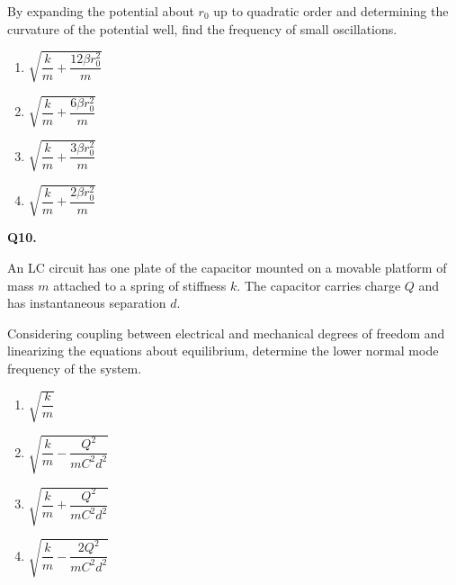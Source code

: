 \documentclass[12pt]{article}
\begin{document}
By expanding the potential about $r_0$ up to quadratic order and determining the curvature of the potential well, find the frequency of small oscillations.

\begin{enumerate}
\item[(A)] $\sqrt{\dfrac{k}{m}+\dfrac{12\beta r_0^2}{m}}$
\item[(B)] $\sqrt{\dfrac{k}{m}+\dfrac{6\beta r_0^2}{m}}$
\item[(C)] $\sqrt{\dfrac{k}{m}+\dfrac{3\beta r_0^2}{m}}$
\item[(D)] $\sqrt{\dfrac{k}{m}+\dfrac{2\beta r_0^2}{m}}$
\end{enumerate}

\bigskip

\textbf{Q10.}

An LC circuit has one plate of the capacitor mounted on a movable platform of mass $m$ attached to a spring of stiffness $k$. The capacitor carries charge $Q$ and has instantaneous separation $d$.

Considering coupling between electrical and mechanical degrees of freedom and linearizing the equations about equilibrium, determine the lower normal mode frequency of the system.

\begin{center}
\end{center}

\begin{enumerate}
\item[(A)] $\sqrt{\dfrac{k}{m}}$
\item[(B)] $\sqrt{\dfrac{k}{m}-\dfrac{Q^2}{mC^2d^2}}$
\item[(C)] $\sqrt{\dfrac{k}{m}+\dfrac{Q^2}{mC^2d^2}}$
\item[(D)] $\sqrt{\dfrac{k}{m}-\dfrac{2Q^2}{mC^2d^2}}$
\end{enumerate}
\end{document}
